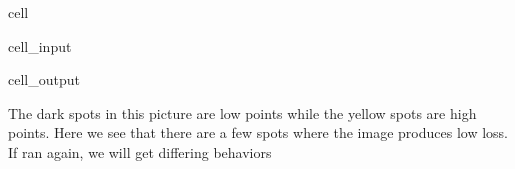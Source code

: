 \documentclass[letterpaper,10pt,english]{jupyterBook}
\begin{document}
\begin{sphinxuseclass}{cell}\begin{sphinxVerbatimInput}

\begin{sphinxuseclass}{cell_input}
\begin{sphinxVerbatim}[commandchars=\\\{\}]
  
\end{sphinxVerbatim}

\end{sphinxuseclass}\end{sphinxVerbatimInput}
\begin{sphinxVerbatimOutput}

\begin{sphinxuseclass}{cell_output}
\noindent{}

\end{sphinxuseclass}\end{sphinxVerbatimOutput}

\end{sphinxuseclass}
\sphinxAtStartPar
The dark spots in this picture are low points while the yellow spots are high points. Here we see that there are a few spots where the image produces low loss. If ran again, we will get differing behaviors
\end{document}
